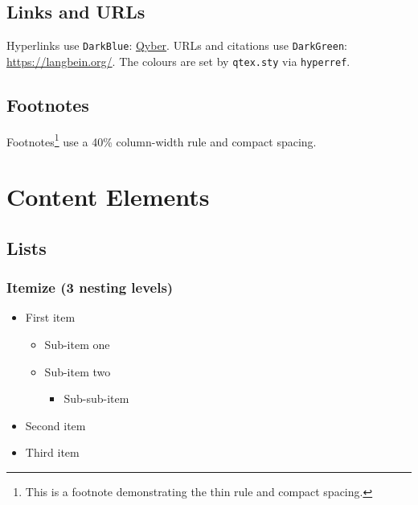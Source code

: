 \documentclass[sans,oneside,numeric,raggedright]{qarticle}
\begin{document}
\lipsum[3]

\subsection{Links and URLs}

Hyperlinks use \texttt{DarkBlue}: \href{https://qyber.black/}{Qyber}.
URLs and citations use \texttt{DarkGreen}: \url{https://langbein.org/}.
The colours are set by \texttt{qtex.sty} via \texttt{hyperref}.

\subsection{Footnotes}

Footnotes\footnote{This is a footnote demonstrating the thin rule and
compact spacing.} use a 40\% column-width rule and compact spacing.

\lipsum[4]

\section{Content Elements}\label{sec:content}

\subsection{Lists}

\subsubsection{Itemize (3 nesting levels)}

\begin{itemize}
  \item First item
    \begin{itemize}
      \item Sub-item one
      \item Sub-item two
        \begin{itemize}
          \item Sub-sub-item
        \end{itemize}
    \end{itemize}
  \item Second item
  \item Third item
\end{itemize}
\end{document}
